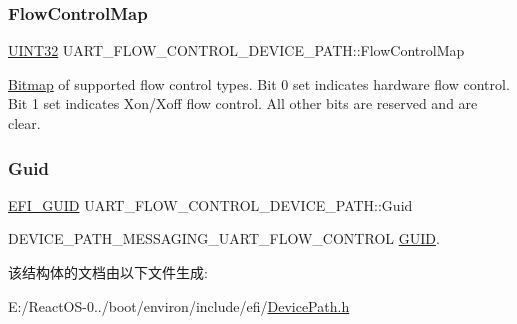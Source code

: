 \subsubsection{\texorpdfstring{Flow\+Control\+Map}{FlowControlMap}}
{\footnotesize\ttfamily \hyperlink{_processor_bind_8h_ae1e6edbbc26d6fbc71a90190d0266018}{U\+I\+N\+T32} U\+A\+R\+T\+\_\+\+F\+L\+O\+W\+\_\+\+C\+O\+N\+T\+R\+O\+L\+\_\+\+D\+E\+V\+I\+C\+E\+\_\+\+P\+A\+T\+H\+::\+Flow\+Control\+Map}

\hyperlink{class_bitmap}{Bitmap} of supported flow control types. Bit 0 set indicates hardware flow control. Bit 1 set indicates Xon/\+Xoff flow control. All other bits are reserved and are clear. \mbox{\label{struct_u_a_r_t___f_l_o_w___c_o_n_t_r_o_l___d_e_v_i_c_e___p_a_t_h_afb5b8ceb84e7179c35cc94f711751198}} 
\subsubsection{\texorpdfstring{Guid}{Guid}}
{\footnotesize\ttfamily \hyperlink{_uefi_base_type_8h_ad87614428813f71edb2c2d802e9ce2af}{E\+F\+I\+\_\+\+G\+U\+ID} U\+A\+R\+T\+\_\+\+F\+L\+O\+W\+\_\+\+C\+O\+N\+T\+R\+O\+L\+\_\+\+D\+E\+V\+I\+C\+E\+\_\+\+P\+A\+T\+H\+::\+Guid}

D\+E\+V\+I\+C\+E\+\_\+\+P\+A\+T\+H\+\_\+\+M\+E\+S\+S\+A\+G\+I\+N\+G\+\_\+\+U\+A\+R\+T\+\_\+\+F\+L\+O\+W\+\_\+\+C\+O\+N\+T\+R\+OL \hyperlink{interface_g_u_i_d}{G\+U\+ID}. 

该结构体的文档由以下文件生成\+:\begin{DoxyCompactItemize}
\item 
E\+:/\+React\+O\+S-\/0../boot/environ/include/efi/\hyperlink{_device_path_8h}{Device\+Path.\+h}\end{DoxyCompactItemize}

